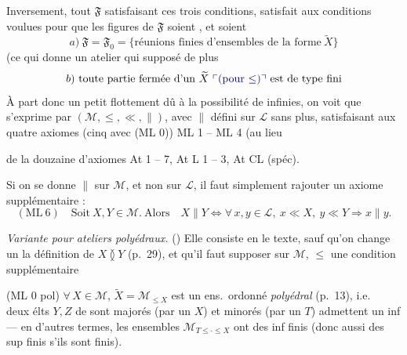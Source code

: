 \documentclass[11pt,a4paper]{article}
\begin{document}
Inversement, tout $\mathfrak{F}$ satisfaisant ces trois conditions, satisfait aux conditions voulues \struck{\ill{}} pour que les figures de $\mathfrak{F}$ soient \ill{}, \ill{} et soient 
\[
  a)\ \mathfrak{F} = \mathfrak{F}_0 = \lbrace \text{réunions finies d'ensembles de la forme}\ \widetilde{X} \rbrace
\]
(ce qui \ill{} donne un atelier qui \ill{} supposé de plus
\[
  b)\ \text{toute partie fermée d'un}\ \widetilde{X}\ \text{\add{(pour $\leq$)} est de type fini}
\]
À part donc un petit flottement dû à la possibilité de  \ill{} infinies, on voit que \struck{\ill{}}  s'exprime par $(\mathcal{M}, \leq, \ll, \parallel)$, avec $\parallel$ défini sur $\mathcal{L}$ sans plus, \struck{\ill{} \ill{}} satisfaisant aux quatre axiomes (cinq avec (ML 0)) ML 1 -- ML 4 (au lieu

de la douzaine d'axiomes At 1 -- 7, At L 1 -- 3, At CL (spéc).

Si on se donne $\parallel$ sur $\mathcal{M}$, et non sur $\mathcal{L}$, il faut simplement rajouter un axiome supplémentaire :
\[
  (\mathrm{ML}\ 6) \quad \text{Soit}\ X, Y \in \mathcal{M}.\ \text{Alors} \quad X \parallel Y \iff \forall\, x, y \in \mathcal{L},\ x \ll X,\ y \ll Y \Rightarrow x \parallel y .
\]

\emph{Variante pour ateliers polyédraux.} () Elle consiste en le \ill{} texte, sauf qu'on change un  la définition de $X \between Y$ (p.~29), et qu'il faut supposer sur $\mathcal{M}$, $\leq$ une condition supplémentaire

(ML 0 pol) \quad $\forall\, X \in \mathcal{M}$, $\widetilde{X} = \mathcal{M}_{\leq X}$ est un ens.\ ordonné \emph{polyédral} (p.~13), i.e.\  deux élts $Y, Z$ de   sont majorés (par un $X$) et minorés \struck{\ill{}} (par un $T$) admettent un inf \add{$\leq$} --- en d'autres termes, les ensembles $\mathcal{M}_{T \leq \cdot \leq X}$ ont des inf finis (donc aussi des sup finis s'ils sont finis).
\end{document}
